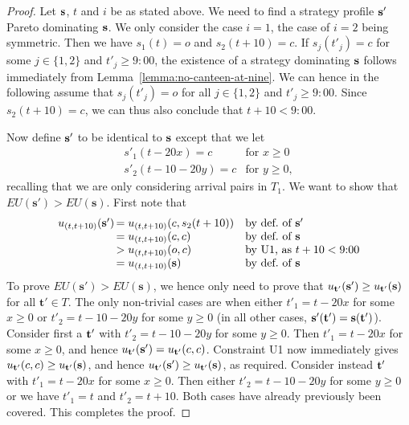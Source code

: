 \documentclass[twocolumn,a4paper,superscriptaddress,nofootinbib]{revtex4}
\begin{document}
\begin{proof}
Let $\bf s$, $t$ and $i$ be as stated above. We need to find a strategy profile $\bf s'$ Pareto dominating $\bf s$. We only consider the case $i=1$, the case of $i=2$ being symmetric. Then we have $s_1(t)=o$ and $s_2(t+10)=c$.  If $s_j(t'_j) = c$ for some $j \in \{1,2\}$ and $t'_j \geq 9{:}00$, the existence of a strategy dominating $\bf s$ follows
immediately from Lemma~\ref{lemma:no-canteen-at-nine}. We can hence in the following assume that $s_j(t'_j) = o$ for all $j \in \{1,2\}$ and $t'_j \geq 9{:}00$. Since $s_2(t+10) =c$, we can thus also conclude that $t + 10 < 9{:}00$.

Now define $\bf s'$ to be identical to $\bf s$ except that we let
\[
  \begin{array}{ll}
    s'_1(t-20x) = c &\text{for } x \geq 0 \\
    s'_2(t-10-20y) = c &\text{for } y \geq 0,
  \end{array}
\]
recalling that we are only considering arrival pairs in $T_1$. We want to show that $EU(\mathbf{s'}) > EU(\mathbf{s})$. First note that
\[
 \begin{array}{rll}
 u_{(t,t+10)}({\bf s}')\!\!\!\!\!{ } &= u_{(t,t+10)} (c, s_2(t+10)) &\text{by def.\ of $\bf s'$} \\
 						&= u_{(t,t+10)} (c, c) &\text{by def.\ of $\bf s$} \\
						&> u_{(t,t+10)} (o,c) &\text{by U1, as } t+10 < 9{:}00 \\
						&= u_{(t,t+10)} ({\bf s}) &\text{by def.\ of $\bf s$}
  \end{array}
\]
To prove $EU(\mathbf{s'}) > EU(\mathbf{s})$, we hence only need to prove that $u_{\bf t'}({\bf s'}) \geq u_{\bf t'}({\bf s})$ for all $\mathbf{t'} \in T$. The only non-trivial cases are when either $t'_1 = t - 20x$ for some $x \geq 0$ or $t'_2 = t - 10 - 20y$ for some $y \geq 0$ (in all other cases, $\mathbf{s'}(\bf t') = \mathbf{s}(\bf t')$). Consider first a $\bf t'$ with $t'_2 = t -10- 20y$ for some $y \geq 0$. Then $t'_1 =  t - 20x$ for some $x \geq 0$, and hence $u_{\bf t'}( {\bf s'}) = u_{\bf t'} (c, c)$. Constraint U1 now immediately gives $u_{\bf t'} (c, c) \geq u_{\bf t'} (\bf s)$, and hence $u_{\bf t'}( {\bf s'}) \geq u_{\bf t'} (\bf s)$, as required. Consider instead $\bf t'$ with $t'_1 = t - 20x$ for some $x \geq 0$. Then either $t'_2 = t - 10 -20y$ for some $y \geq 0$ or we have $t'_1 = t$ and $t'_2 = t+10$. Both cases have already previously been covered. This completes the proof.
\end{proof}
\end{document}
